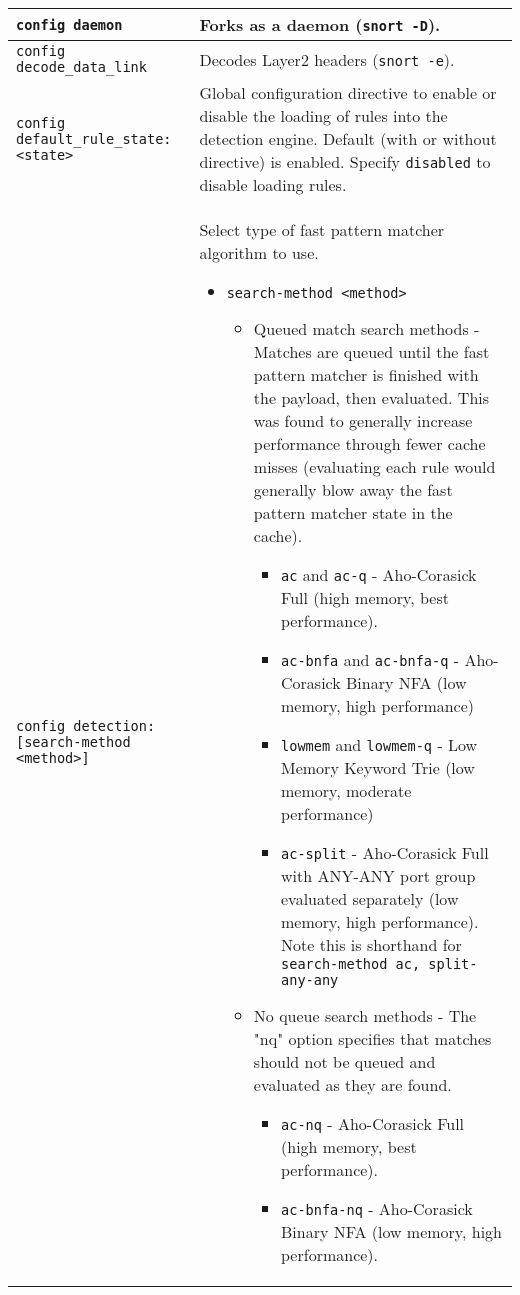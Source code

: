 \documentclass[english]{report}
\begin{document}
\begin{center}
\begin{longtable}[t]{| p{2.5in} | p{3.5in} |}
\hline
\texttt{config daemon} & Forks as a daemon (\texttt{snort -D}). \\

\hline
\texttt{config decode\_data\_link} & Decodes Layer2 headers (\texttt{snort
-e}). \\

\hline
\texttt{config default\_rule\_state: <state>} & Global configuration directive
to enable or disable the loading of rules into the detection engine.  Default
(with or without directive) is enabled.  Specify \texttt{disabled} to disable
loading rules. \\

\hline
\texttt{config detection: [search-method <method>]} & Select type of fast pattern
matcher algorithm to use.
\begin{itemize}
\item \texttt{search-method <method>}
\begin{itemize}
\item Queued match search methods -  Matches are queued until the fast pattern
matcher is finished with the payload, then evaluated.  This was found to generally
increase performance through fewer cache misses (evaluating each rule would
generally blow away the fast pattern matcher
state in the cache).
\begin{itemize}
\item \texttt{ac} and \texttt{ac-q} - Aho-Corasick Full (high memory, best performance).
\item \texttt{ac-bnfa} and \texttt{ac-bnfa-q} - Aho-Corasick Binary NFA (low memory, high performance)
\item \texttt{lowmem} and \texttt{lowmem-q} - Low Memory Keyword Trie (low memory, moderate performance)
\item \texttt{ac-split} - Aho-Corasick Full with ANY-ANY port group evaluated separately (low memory, high performance).  Note this is shorthand for \texttt{search-method ac, split-any-any}
\end{itemize}
\end{itemize}
\begin{itemize}
\item No queue search methods - The "nq" option specifies that matches should not
be queued and evaluated as they are found.
\begin{itemize}
\item \texttt{ac-nq} - Aho-Corasick Full (high memory, best performance).
\item \texttt{ac-bnfa-nq} - Aho-Corasick Binary NFA (low memory, high performance).

\end{itemize}
\end{itemize}
\end{itemize}
\end{longtable}
\end{center}
\end{document}
